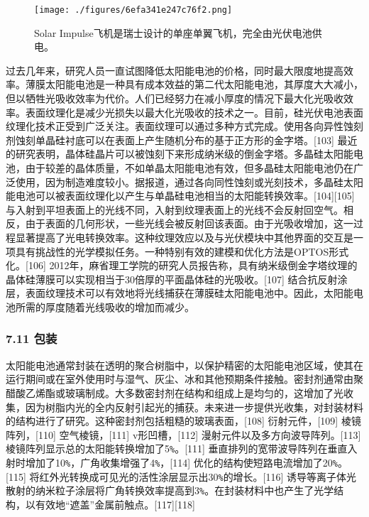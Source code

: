 \begin{figure}[ht]
\centering
\texttt{[image: ./figures/6efa341e247c76f2.png]}
\caption{Solar Impulse飞机是瑞士设计的单座单翼飞机，完全由光伏电池供电。} \label{fig_TYNDC_4}
\end{figure}

过去几年来，研究人员一直试图降低太阳能电池的价格，同时最大限度地提高效率。薄膜太阳能电池是一种具有成本效益的第二代太阳能电池，其厚度大大减小，但以牺牲光吸收效率为代价。人们已经努力在减小厚度的情况下最大化光吸收效率。表面纹理化是减少光损失以最大化光吸收的技术之一。目前，硅光伏电池表面纹理化技术正受到广泛关注。表面纹理可以通过多种方式完成。使用各向异性蚀刻剂蚀刻单晶硅衬底可以在表面上产生随机分布的基于正方形的金字塔。[103] 最近的研究表明，晶体硅晶片可以被蚀刻下来形成纳米级的倒金字塔。多晶硅太阳能电池，由于较差的晶体质量，不如单晶太阳能电池有效，但多晶硅太阳能电池仍在广泛使用，因为制造难度较小。据报道，通过各向同性蚀刻或光刻技术，多晶硅太阳能电池可以被表面纹理化以产生与单晶硅电池相当的太阳能转换效率。[104][105] 与入射到平坦表面上的光线不同，入射到纹理表面上的光线不会反射回空气。相反，由于表面的几何形状，一些光线会被反射回该表面。由于光吸收增加，这一过程显著提高了光电转换效率。这种纹理效应以及与光伏模块中其他界面的交互是一项具有挑战性的光学模拟任务。一种特别有效的建模和优化方法是OPTOS形式化。[106] 2012年，麻省理工学院的研究人员报告称，具有纳米级倒金字塔纹理的晶体硅薄膜可以实现相当于30倍厚的平面晶体硅的光吸收。[107] 结合抗反射涂层，表面纹理技术可以有效地将光线捕获在薄膜硅太阳能电池中。因此，太阳能电池所需的厚度随着光线吸收的增加而减少。

\subsubsection{7.11 包装}

太阳能电池通常封装在透明的聚合树脂中，以保护精密的太阳能电池区域，使其在运行期间或在室外使用时与湿气、灰尘、冰和其他预期条件接触。密封剂通常由聚醋酸乙烯酯或玻璃制成。大多数密封剂在结构和组成上是均匀的，这增加了光收集，因为树脂内光的全内反射引起光的捕获。未来进一步提供光收集，对封装材料的结构进行了研究。这种密封剂包括粗糙的玻璃表面，[108] 衍射元件，[109] 棱镜阵列，[110] 空气棱镜，[111] v形凹槽，[112] 漫射元件以及多方向波导阵列。[113] 棱镜阵列显示总的太阳能转换增加了5\verb|%|。[111] 垂直排列的宽带波导阵列在垂直入射时增加了10\verb|%|，广角收集增强了4\verb|%|，[114] 优化的结构使短路电流增加了20\verb|%|。[115] 将红外光转换成可见光的活性涂层显示出30\verb|%|的增长。[116] 诱导等离子体光散射的纳米粒子涂层将广角转换效率提高到3\verb|%|。在封装材料中也产生了光学结构，以有效地“遮盖”金属前触点。[117][118]

